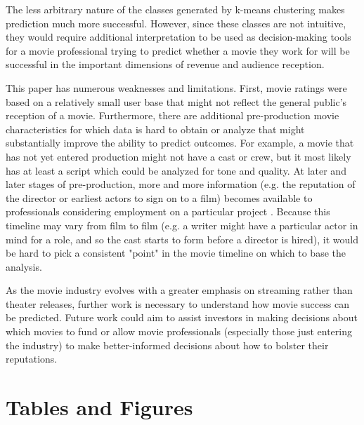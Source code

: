 \documentclass[12pt,english]{article}
\begin{document}
The less arbitrary nature of the classes generated by k-means clustering makes prediction much more successful. However, since these classes are not intuitive, they would require additional interpretation to be used as decision-making tools for a movie professional trying to predict whether a movie they work for will be successful in the important dimensions of revenue and audience reception.

This paper has numerous weaknesses and limitations. First, movie ratings were based on a relatively small user base that might not reflect the general public's reception of a movie. Furthermore, there are additional pre-production movie characteristics for which data is hard to obtain or analyze that might substantially improve the ability to predict outcomes. For example, a movie that has not yet entered production might not have a cast or crew, but it most likely has at least a script which could be analyzed for tone and quality. At later and later stages of pre-production, more and more information (e.g. the reputation of the director or earliest actors to sign on to a film) becomes available to professionals considering employment on a particular project . Because this timeline may vary from film to film (e.g. a writer might have a particular actor in mind for a role, and so the cast starts to form before a director is hired), it would be hard to pick a consistent "point" in the movie timeline on which to base the analysis.

As the movie industry evolves with a greater emphasis on streaming rather than theater releases, further work is necessary to understand how movie success can be predicted. Future work could aim to assist investors in making decisions about which movies to fund or allow movie professionals (especially those just entering the industry) to make better-informed decisions about how to bolster their reputations.

\newpage



\section{Tables and Figures}
\end{document}

